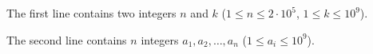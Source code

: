 The first line contains two integers $n$ and $k$ ($1 \le n \le 2 \cdot 10^5$, $1 \le k \le 10^9$).

The second line contains $n$ integers $a_1, a_2, \ldots, a_n$ ($1 \le a_i \le 10^9$).
